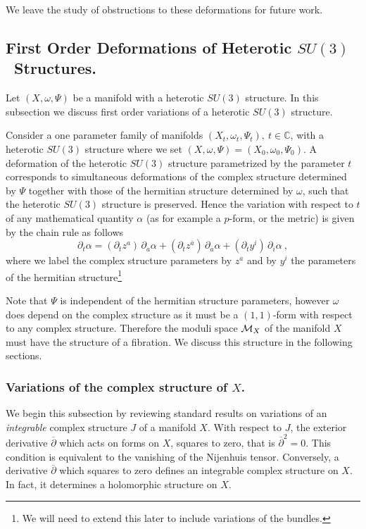 \documentclass[12pt,a4paper]{article}
\newcommand{\IC}{\mathbb{C}}
\def\bar#1{\overline{#1}}
\def\bp{\bar{\partial}}
\theoremstyle{definition}
\begin{document}
We leave the study of obstructions to these deformations for future work.

\subsection{First Order Deformations of Heterotic \texorpdfstring{$SU(3)$}\ \ Structures.}
 \label{subsec:infsu3}
 
 Let $(X, \omega, \Psi)$ be a manifold with a heterotic $SU(3)$ structure.  In this subsection we discuss first order variations of a heterotic $SU(3)$ structure.
   
Consider a one parameter family of manifolds $(X_t, \omega_t, \Psi_t), ~t\in\IC$, with a heterotic $SU(3)$ structure where we set
$(X, \omega,\Psi) = (X_0, \omega_0, \Psi_0)$. 
A deformation of the heterotic $SU(3)$ structure parametrized by the parameter $t$ corresponds to simultaneous deformations of the complex structure determined by $\Psi$ together with those of the hermitian structure
determined by $\omega$, such that the heterotic $SU(3)$ structure is preserved.  Hence the variation with respect to $t$ of any mathematical quantity $\alpha$ (as for example a $p$-form, or the metric) is given by the chain rule as follows
\begin{equation*}
\partial_t\alpha = (\partial_t z^a)\, \partial_a\alpha + 
(\partial_t z^{\bar a})\, \partial_{\bar a}\alpha + (\partial_t y^i)\, \partial_i\alpha ~,
\end{equation*}
where we label the complex structure parameters by $z^a$ and by $y^i$ the parameters of the hermitian structure\footnote{We will need to extend this later to include variations of the bundles.}
 

Note that $\Psi$ is independent of the hermitian structure parameters, however $\omega$ does depend on the complex structure as it must be  a $(1,1)$-form with respect to any complex structure. Therefore the moduli space ${\cal M}_X$ of the manifold $X$ must have the structure of a fibration.  We discuss this structure in the following sections.

\subsubsection{Variations of the complex structure of \texorpdfstring{$X$}\ .}
\label{sec:varsJ}

We begin this subsection by reviewing standard results on variations of an {\it integrable} complex structure $J$ of a manifold $X$.   With respect to $J$, the exterior derivative $\bp$ which acts on forms on $X$, squares to zero, that is $\bp^2=0$.  This condition is equivalent to the vanishing of the Nijenhuis tensor.  Conversely, a derivative $\bp$ which squares to zero defines an integrable complex structure on $X$. In fact, it determines a holomorphic structure on $X$.
\end{document}
